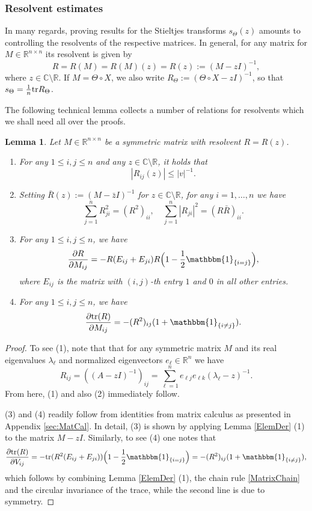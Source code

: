 \documentclass[a4paper,12pt]{amsart}
\numberwithin{equation}{section}
\newtheorem{lemma}[satz]{Lemma}
\theoremstyle{remark}
\def\C{{\mathbb C}}
\def\R{{\mathbb R}}
\def\tr{{\rm tr}}
\begin{document}
\subsubsection{Resolvent estimates}
In many regards, proving results for the Stieltjes transforms $s_\Theta (z)$ amounts to controlling the resolvents of the respective matrices. In general, for any matrix for $M \in \R^{n \times n}$ its resolvent is given by
\begin{equation}\label{Resolvent}
R = R(M)= R(M)(z) = R(z) := (M-zI)^{-1},
\end{equation}
where $z \in \C \setminus \R$. If $M=\Theta \circ X$, we also write $R_\Theta := (\Theta \circ X -z I)^{-1}$, so that $s_\Theta = \frac{1}{n} \tr R_\Theta$.

The following technical lemma collects a number of relations for resolvents which we shall need all over the proofs.

\begin{lemma}\label{lem:Res}
    Let $M \in \R^{n \times n}$ be a symmetric matrix with resolvent $R=R(z)$.
    \begin{enumerate}
        \item For any $1 \le i,j \le n$ and any $z \in \C \setminus \R$, it holds that
        \[
        |R_{ij}(z)| \le |v|^{-1}.
        \]
        \item Setting $\bar{R}(z) := (M - \bar{z}I)^{-1}$ for $z \in \C \setminus \R$, for any $i = 1, \ldots, n$ we have
        \[
        \sum_{j=1}^n R_{ji}^2 = (R^2)_{ii}, \quad \sum_{j=1}^n |R_{ji}|^2 = (R\bar {R})_{ii}.
        \]
        \item For any $1 \le i,j \le n$, we have
        \[
        \frac{\partial R}{\partial M_{ij}} = - R(E_{ij} + E_{ji})R \Big(1 - \frac{1}{2}\mathbbm{1}_{\{i=j\}}\Big),
        \]
        where $E_{ij}$ is the matrix with $(i,j)$-th entry $1$ and $0$ in all other entries.
        \item For any $1 \le i,j \le n$, we have
        \[
        \frac{\partial \tr(R)}{\partial M_{ij}} = - (R^2)_{ij} (1 +\mathbbm{1}_{\{i\ne j\}}).
        \]
    \end{enumerate}
\end{lemma}

\begin{proof}
    To see (1), note that that  for any symmetric matrix $M$ and its real eigenvalues $\lambda_\ell$ and normalized eigenvectors $e_\ell\in \R^n$ we have
    \[ R_{ij} = ((A-z I)^{-1})_{ij}= \sum_{\ell=1}^n e_{\ell j} e_{\ell k}(\lambda_\ell- z)^{-1}.\]
    From here, (1) and also (2) immediately follow.

    (3) and (4) readily follow from identities from matrix calculus as presented in Appendix \ref{sec:MatCal}. In detail, (3) is shown by applying Lemma \ref{ElemDer} (1) to the matrix $M-zI$. Similarly, to see (4) one notes that
    \[
    \frac{\partial \tr(R)}{\partial V_{ij}} = -\tr(R^2 (E_{ij} + E_{ji}))\Big(1 - \frac{1}{2}\mathbbm{1}_{\{i=j\}}\Big) = - (R^2)_{ij} (1 +\mathbbm{1}_{\{i\ne j\}}),
    \]
    which follows by combining Lemma \ref{ElemDer} (1), the chain rule \eqref{MatrixChain} and the circular invariance of the trace, while the second line is due to symmetry.
\end{proof}
\end{document}
